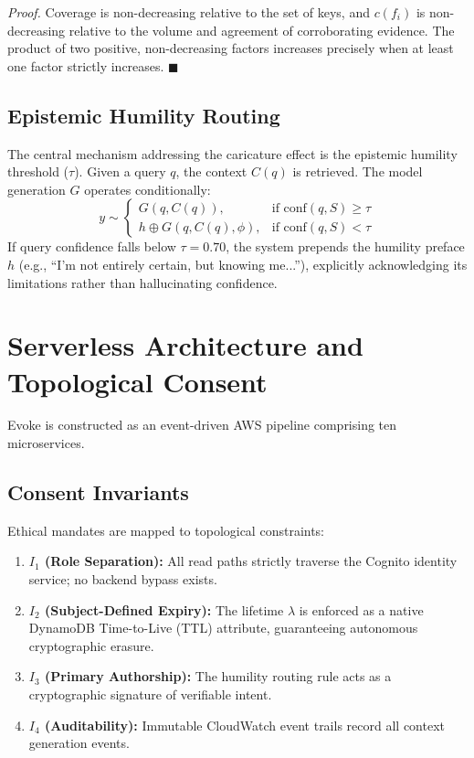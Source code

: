 \documentclass[journal]{IEEEtran}
\begin{document}
\textit{Proof.} Coverage is non-decreasing relative to the set of keys, and $c(f_i)$ is non-decreasing relative to the volume and agreement of corroborating evidence. The product of two positive, non-decreasing factors increases precisely when at least one factor strictly increases. $\blacksquare$

\subsection{Epistemic Humility Routing}
The central mechanism addressing the caricature effect is the epistemic humility threshold ($\tau$). Given a query $q$, the context $C(q)$ is retrieved. The model generation $G$ operates conditionally:
\begin{equation}
y \sim \begin{cases} G(q, C(q)), & \text{if } \text{conf}(q, S) \ge \tau \\ h \oplus G(q, C(q), \phi), & \text{if } \text{conf}(q, S) < \tau \end{cases}
\end{equation}
If query confidence falls below $\tau = 0.70$, the system prepends the humility preface $h$ (e.g., ``I'm not entirely certain, but knowing me...''), explicitly acknowledging its limitations rather than hallucinating confidence.

\section{Serverless Architecture and Topological Consent}
Evoke is constructed as an event-driven AWS pipeline comprising ten microservices. 

\subsection{Consent Invariants}
Ethical mandates are mapped to topological constraints:
\begin{enumerate}
    \item \textbf{$I_1$ (Role Separation):} All read paths strictly traverse the Cognito identity service; no backend bypass exists.
    \item \textbf{$I_2$ (Subject-Defined Expiry):} The lifetime $\lambda$ is enforced as a native DynamoDB Time-to-Live (TTL) attribute, guaranteeing autonomous cryptographic erasure.
    \item \textbf{$I_3$ (Primary Authorship):} The humility routing rule acts as a cryptographic signature of verifiable intent.
    \item \textbf{$I_4$ (Auditability):} Immutable CloudWatch event trails record all context generation events.
\end{enumerate}
\end{document}
